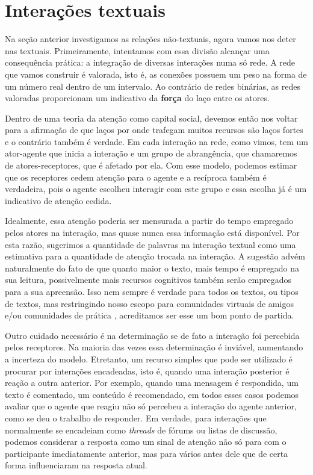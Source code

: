 \section{Interações textuais}

Na seção anterior investigamos as relações não-textuais, agora vamos nos deter
nas textuais. Primeiramente, intentamos com essa divisão alcançar uma
consequência prática: a integração de diversas interações numa só rede. A rede
que vamos construir é valorada, isto é, as conexões possuem um peso na forma de
um número real dentro de um intervalo. Ao contrário de redes binárias, as redes
valoradas proporcionam um indicativo da \textbf{força} do laço entre os atores.

Dentro de uma teoria da atenção como capital social, devemos então nos voltar
para a afirmação de que laços por onde trafegam muitos recursos são laços fortes
e o contrário também é verdade. Em cada interação na rede, como vimos, tem um
ator-agente que inicia a interação e um grupo de abrangência, que chamaremos de
atores-receptores, que é afetado por ela. Com esse modelo, podemos estimar que
os receptores cedem atenção para o agente e a recíproca também é verdadeira,
pois o agente escolheu interagir com este grupo e essa escolha já é um
indicativo de atenção cedida.

Idealmente, essa atenção poderia ser mensurada a partir do tempo empregado pelos
atores na interação, mas quase nunca essa informação está disponível. Por esta
razão, sugerimos a quantidade de palavras na interação textual como uma
estimativa para a quantidade de atenção trocada na interação. A sugestão advém
naturalmente do fato de que quanto maior o texto, mais tempo é empregado na sua
leitura, possivelmente mais recursos cognitivos também serão empregados para a
sua apreensão. Isso nem sempre é verdade para todos os textos, ou tipos de
textos, mas restringindo nosso escopo para comunidades virtuais de amigos e/ou
comunidades de prática \citep{Lave1991, Lave1991a}, acreditamos ser esse
um bom ponto de partida.

Outro cuidado necessário é na determinação se de fato a interação foi percebida
pelos receptores. Na maioria das vezes essa determinação é inviável, aumentando
a incerteza do modelo. Etretanto, um recurso simples que pode ser utilizado é
procurar por interações encadeadas, isto é, quando uma interação posterior é 
reação a outra anterior. Por exemplo, quando uma mensagem é respondida, um texto
é comentado, um conteúdo é recomendado, em todos esses casos podemos avaliar que
o agente que reagiu não só percebeu a interação do agente anterior, como se deu
o trabalho de responder. Em verdade, para interações que normalmente se
encadeiam como \emph{threads} de fórums ou listas de discussão, podemos
considerar a resposta como um sinal de atenção não só para com o participante
imediatamente anterior, mas para vários antes dele que de certa forma
influenciaram na resposta atual.

